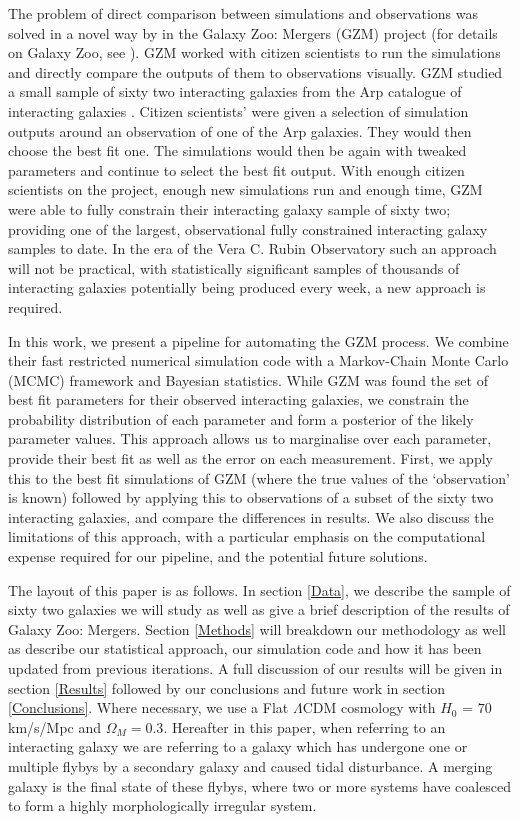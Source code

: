 The problem of direct comparison between simulations and observations was solved in a novel way by \citet{Holincheck_16} in the Galaxy Zoo: Mergers (GZM) project (for details on Galaxy Zoo, see \citet{Lintott_08}). GZM worked with citizen scientists to run the simulations and directly compare the outputs of them to observations visually. GZM studied a small sample of sixty two interacting galaxies from the Arp catalogue of interacting galaxies \citep{Arp_66}. Citizen scientists' were given a selection of simulation outputs around an observation of one of the Arp galaxies. They would then choose the best fit one. The simulations would then be again with tweaked parameters and continue to select the best fit output. With enough citizen scientists on the project, enough new simulations run and enough time, GZM were able to fully constrain their interacting galaxy sample of sixty two; providing one of the largest, observational fully constrained interacting galaxy samples to date. In the era of the Vera C. Rubin Observatory such an approach will not be practical, with statistically significant samples of thousands of interacting galaxies potentially being produced every week, a new approach is required.

In this work, we present a pipeline for automating the GZM process. We combine their fast restricted numerical simulation code with a Markov-Chain Monte Carlo (MCMC) framework and Bayesian statistics. While GZM was found the set of best fit parameters for their observed interacting galaxies, we constrain the probability distribution of each parameter and form a posterior of the likely parameter values. This approach allows us to marginalise over each parameter, provide their best fit as well as the error on each measurement. First, we apply this to the best fit simulations of GZM (where the true values of the `observation' is known) followed by applying this to observations of a subset of the sixty two interacting galaxies, and compare the differences in results. We also discuss the limitations of this approach, with a particular emphasis on the computational expense required for our pipeline, and the potential future solutions.

The layout of this paper is as follows. In section \ref{Data}, we describe the sample of sixty two galaxies we will study as well as give a brief description of the results of Galaxy Zoo: Mergers. Section \ref{Methods} will breakdown our methodology as well as describe our statistical approach, our simulation code and how it has been updated from previous iterations. A full discussion of our results will be given in section \ref{Results} followed by our conclusions and future work in section \ref{Conclusions}. Where necessary, we use a Flat $\Lambda$CDM cosmology with $H_0$ = $70$\,km/s/Mpc and $\Omega_M = 0.3$. Hereafter in this paper, when referring to an interacting galaxy we are referring to a galaxy which has undergone one or multiple flybys by a secondary galaxy and caused tidal disturbance. A merging galaxy is the final state of these flybys, where two or more systems have coalesced to form a highly morphologically irregular system.

